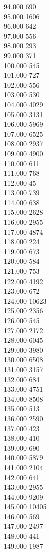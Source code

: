 { 94.000	690 \\
 95.000	1606 \\
 96.000	642 \\
 97.000	556 \\
 98.000	293 \\
 99.000	371 \\
 100.000	545 \\
 101.000	727 \\
 102.000	556 \\
 103.000	530 \\
 104.000	4029 \\
 105.000	3131 \\
 106.000	5969 \\
 107.000	6525 \\
 108.000	2937 \\
 109.000	4900 \\
 110.000	611 \\
 111.000	768 \\
 112.000	45 \\
 113.000	739 \\
 114.000	638 \\
 115.000	2628 \\
 116.000	2955 \\
 117.000	4874 \\
 118.000	224 \\
 119.000	673 \\
 120.000	584 \\
 121.000	753 \\
 122.000	4192 \\
 123.000	672 \\
 124.000	10623 \\
 125.000	2356 \\
 126.000	545 \\
 127.000	2172 \\
 128.000	6045 \\
 129.000	3980 \\
 130.000	6508 \\
 131.000	3157 \\
 132.000	684 \\
 133.000	4751 \\
 134.000	8508 \\
 135.000	513 \\
 136.000	2590 \\
 137.000	423 \\
 138.000	410 \\
 139.000	690 \\
 140.000	5879 \\
 141.000	2104 \\
 142.000	641 \\
 143.000	2955 \\
 144.000	9209 \\
 145.000	10405 \\
 146.000	569 \\
 147.000	2497 \\
 148.000	441 \\
 149.000	1987 \\
}
